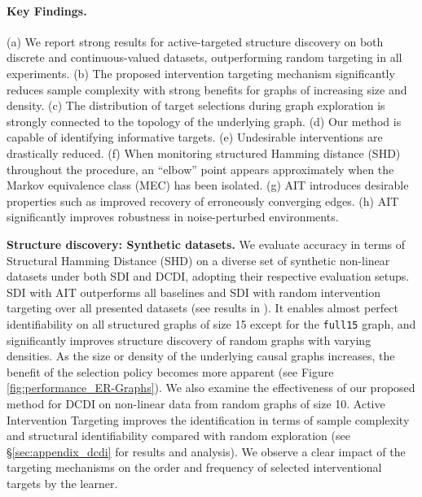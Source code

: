 \documentclass[nohyperref]{article}
\theoremstyle{plain}
\theoremstyle{definition}
\theoremstyle{remark}
\begin{document}
\paragraph{Key Findings.} (a) We report strong results for active-targeted structure discovery on both discrete and continuous-valued datasets, outperforming random targeting in all experiments. (b) The proposed intervention targeting mechanism significantly reduces sample complexity with strong benefits for graphs of increasing size and density. (c) The distribution of target selections during graph exploration is strongly connected to the topology of the underlying graph. (d) Our method is capable of identifying informative targets. (e) Undesirable interventions are drastically reduced. (f) When monitoring structured Hamming distance (SHD) throughout the procedure, an ``elbow'' point appears approximately when the Markov equivalence class (MEC) has been isolated. (g) AIT introduces desirable properties such as improved recovery of erroneously converging edges. (h) AIT significantly improves robustness in noise-perturbed environments.



\textbf{Structure discovery: Synthetic datasets.} 
We  evaluate accuracy in terms of Structural Hamming Distance (SHD) \citep{acid2003searching} on a diverse set of synthetic non-linear datasets under both SDI and DCDI, adopting their respective evaluation setups. SDI with AIT outperforms all baselines and SDI with random intervention targeting over all presented datasets (see results in ). It enables almost perfect identifiability on all structured graphs of size 15 except for the \texttt{full15} graph, and significantly improves structure discovery of random graphs with varying densities. As the size or density of the underlying causal graphs increases, the benefit of the selection policy becomes more apparent (see Figure \ref{fig:performance_ER-Graphs}). \label{sec:dcdi_experiments}
We also examine the effectiveness of our proposed method for DCDI \citep{brouillard2020differentiable} on non-linear data from random graphs of size 10. Active Intervention Targeting improves the identification in terms of sample complexity and structural identifiability compared with random exploration (see \S\ref{sec:appendix_dcdi} for results and analysis). We observe a clear impact of the targeting mechanisms on the order and frequency of selected interventional targets by the learner. 
\end{document}
